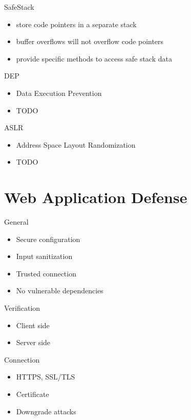 \documentclass{curs}
\begin{document}
\begin{frame}{SafeStack}
  \begin{itemize}
    \item store code pointers in a separate stack
    \item buffer overflows will not overflow code pointers
    \item provide specific methods to access safe stack data
  \end{itemize}
\end{frame}

\begin{frame}{DEP}
  \begin{itemize}
    \item Data Execution Prevention
    \item TODO
  \end{itemize}
\end{frame}

\begin{frame}{ASLR}
  \begin{itemize}
    \item Address Space Layout Randomization
    \item TODO
  \end{itemize}
\end{frame}

\section{Web Application Defense}

\begin{frame}{General}
  \begin{itemize}
    \item Secure configuration
    \item Input sanitization
    \item Trusted connection
    \item No vulnerable dependencies
  \end{itemize}
\end{frame}

\begin{frame}{Verification}
  \begin{itemize}
    \item Client side
    \item Server side
  \end{itemize}
\end{frame}

\begin{frame}{Connection}
  \begin{itemize}
    \item HTTPS, SSL/TLS
    \item Certificate
    \item Downgrade attacks
  \end{itemize}
\end{frame}
\end{document}
